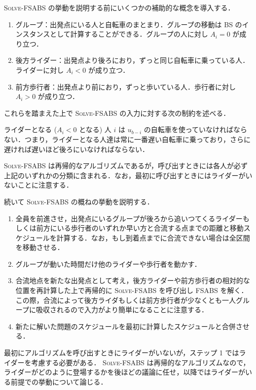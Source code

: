\textsc{Solve-FSABS} の挙動を説明する前にいくつかの補助的な概念を導入する．
\begin{enumerate}
\item グループ：出発点にいる人と自転車のまとまり．グループの移動は BS のインスタンスとして計算することができる．グループの人に対し $A_i = 0$ が成り立つ．
\item 後方ライダー：出発点より後ろにおり，ずっと同じ自転車に乗っている人．ライダーに対し $A_i < 0$ が成り立つ．
\item 前方歩行者：出発点より前におり，ずっと歩いている人．歩行者に対し $A_i > 0$ が成り立つ．
\end{enumerate}
これらを踏まえた上で \textsc{Solve-FSABS} の入力に対する次の制約を述べる．
\begin{condition}\label{condition:riders-order}
  ライダーとなる ($A_i < 0$ となる) 人 $i$ は $u_{b - i}$ の自転車を使っていなければならない．つまり，ライダーとなる人達は常に一番遅い自転車に乗っており，さらに遅ければ遅いほど後ろにいなければならない．
\end{condition}
\textsc{Solve-FSABS} は再帰的なアルゴリズムであるが，呼び出すときには各人が必ず上記のいずれかの分類に含まれる．なお，最初に呼び出すときにはライダーがいないことに注意する．

続いて \textsc{Solve-FSABS} の概ねの挙動を説明する．
\begin{enumerate}
\item 全員を前進させ，出発点にいるグループが後ろから追いつてくるライダーもしくは前方にいる歩行者のいずれか早い方と合流する点までの距離と移動スケジュールを計算する．なお，もし到着点までに合流できない場合は全区間を移動させる．
\item グループが動いた時間だけ他のライダーや歩行者を動かす．
\item 合流地点を新たな出発点として考え，後方ライダーや前方歩行者の相対的な位置を再計算した上で再帰的に \textsc{Solve-FSABS} を呼び出し FSABS を解く．この際，合流によって後方ライダもしくは前方歩行者が少なくとも一人グループに吸収されるので入力がより簡単になることに注意する．
\item 新たに解いた問題のスケジュールを最初に計算したスケジュールと合併させる．
\end{enumerate}

最初にアルゴリズムを呼び出すときにライダーがいないが，ステップ 1 ではライダーを考慮する必要がある． \textsc{Solve-FSABS} は再帰的なアルゴリズムなので，ライダーがどのように登場するかを後ほどの議論に任せ，以降ではライダーがいる前提での挙動について論じる．

